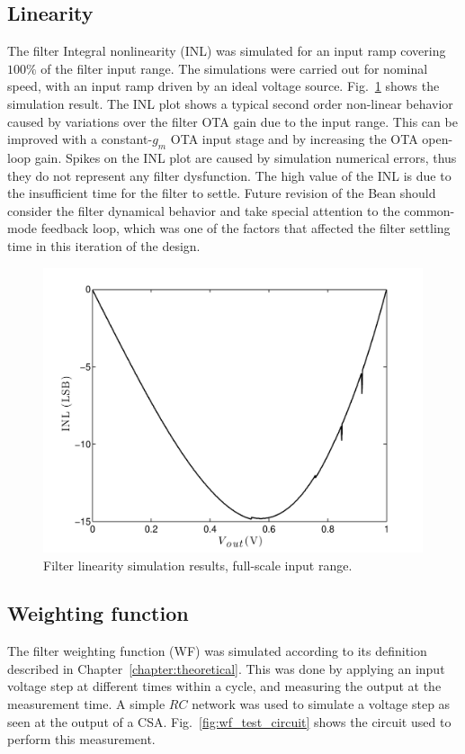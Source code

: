\subsection{Linearity}
The filter Integral nonlinearity (INL) was simulated for an input ramp covering $100\%$ of the filter input range. The simulations were carried out for nominal speed, with an input ramp driven by an ideal voltage source. Fig.~\ref{fig:inl} shows the simulation result. The INL plot shows a typical second order non-linear behavior caused by variations over the filter OTA gain due to the input range. This can be improved with a constant-$g_m$ OTA input stage and by increasing the OTA open-loop gain.  Spikes on the INL plot are caused by simulation numerical errors, thus they do not represent any filter dysfunction. The high value of the INL is due to the insufficient time for the filter to settle. Future revision of the Bean should consider the filter dynamical behavior and take special attention to the common-mode feedback loop, which was one of the factors that affected the filter settling time in this iteration of the design. 

\begin{figure}[!t]
	\centering
	\includegraphics[width=4.4in]{./Test/linearity.pdf}
	\caption{Filter linearity simulation results, full-scale input range.}\label{fig:inl}
\end{figure}

\subsection{Weighting function}
The filter weighting function (WF) was simulated according to its definition described in Chapter~\ref{chapter:theoretical}. This was done by applying an input voltage step at different times within a cycle, and measuring the output at the measurement time. A simple $RC$ network was used to simulate a voltage step as seen at the output of a CSA. Fig.~\ref{fig:wf_test_circuit} shows the circuit used to perform this measurement. 

